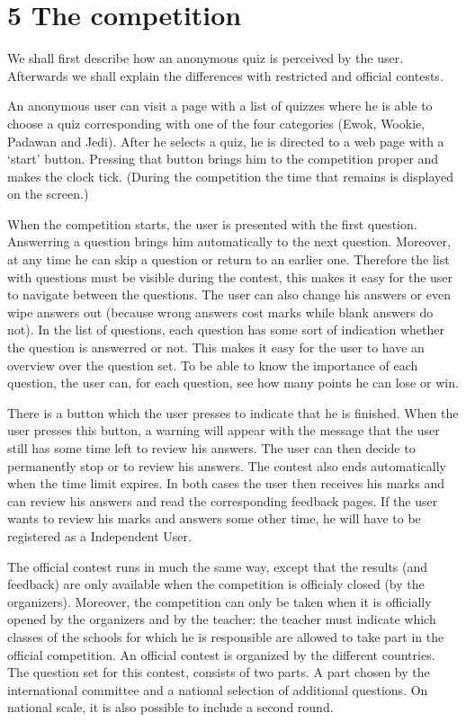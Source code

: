 \section*{5 The competition}

We shall first describe how an anonymous quiz is perceived by the user. Afterwards we shall explain 
the differences with restricted and official contests.

An anonymous user can visit a page with a list of quizzes where he is able to choose a quiz corresponding 
with one of the four categories (Ewok, Wookie, Padawan and Jedi). After he selects a quiz, he is directed to a web page with a `start' button. Pressing that button 
brings him to the competition proper and makes the clock tick. (During the competition the time that remains
is displayed on the screen.) 

When the competition starts, the user is presented with the first question. Answerring a question brings
him automatically to the next question. Moreover, at any time he can skip a question or return to an earlier 
one. Therefore the list with questions must be visible during the contest, this makes it easy for the user
to navigate between the questions. The user can also change his answers or even wipe answers out (because 
wrong answers cost marks while blank answers do not). In the list of questions, each question has some 
sort of indication whether the question is answerred or not. This makes it easy for the user to have an
overview over the question set. To be able to know the importance of each question, the user can, for each
question, see how many points he can lose or win. 

There is a button which the user presses to indicate that he is finished. When the user presses this 
button, a warning will appear with the message that the user still has some time left to review his
answers. The user can then decide to permanently stop or to review his answers. The contest also ends
automatically when the time limit expires. In both cases the user then receives his marks and can review his
answers and read the corresponding feedback pages. If the user wants to review his marks and answers some 
other time, he will have to be registered as a Independent User. 

The official contest runs in much the same way, except that the results (and feedback) are only available
when the competition is officialy closed (by the organizers). Moreover, the competition can only be taken
when it is officially opened by the organizers and by the teacher: the teacher must indicate which classes
of the schools for which he is responsible are allowed to take part in the official competition. An official
contest is organized by the different countries. The question set for this contest, consists of two parts. 
A part chosen by the international committee and a national selection of additional questions. On national 
scale, it is also possible to include a second round. 

